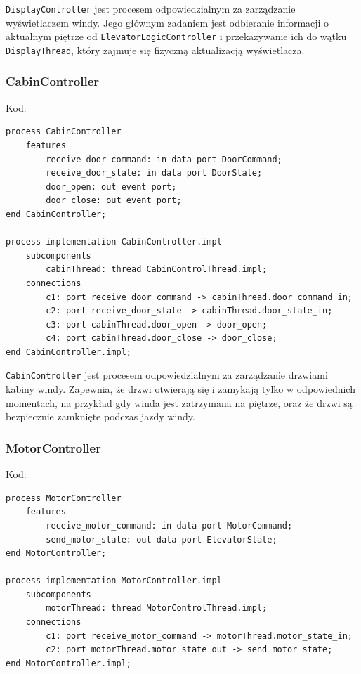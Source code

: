 \documentclass{article}
\begin{document}
    \texttt{DisplayController} jest procesem odpowiedzialnym za zarządzanie wyświetlaczem windy. Jego głównym zadaniem jest odbieranie informacji o aktualnym piętrze od \texttt{ElevatorLogicController} i przekazywanie ich do wątku \texttt{DisplayThread}, który zajmuje się fizyczną aktualizacją wyświetlacza.





    \subsubsection{CabinController}

    Kod:
    
    \begin{lstlisting}[basicstyle=\ttfamily, keywordstyle=\bfseries]
process CabinController
    features
        receive_door_command: in data port DoorCommand;
        receive_door_state: in data port DoorState;
        door_open: out event port;
        door_close: out event port;
end CabinController;

process implementation CabinController.impl
    subcomponents
        cabinThread: thread CabinControlThread.impl;
    connections
        c1: port receive_door_command -> cabinThread.door_command_in;
        c2: port receive_door_state -> cabinThread.door_state_in;
        c3: port cabinThread.door_open -> door_open;
        c4: port cabinThread.door_close -> door_close;
end CabinController.impl;
    \end{lstlisting}

    \texttt{CabinController} jest procesem odpowiedzialnym za zarządzanie drzwiami kabiny windy. Zapewnia, że drzwi otwierają się i zamykają tylko w odpowiednich momentach, na przykład gdy winda jest zatrzymana na piętrze, oraz że drzwi są bezpiecznie zamknięte podczas jazdy windy.



    \subsubsection{MotorController}

    Kod:
    
    \begin{lstlisting}[basicstyle=\ttfamily, keywordstyle=\bfseries]
process MotorController
    features
        receive_motor_command: in data port MotorCommand;
        send_motor_state: out data port ElevatorState;
end MotorController;

process implementation MotorController.impl
    subcomponents
        motorThread: thread MotorControlThread.impl; 
    connections
        c1: port receive_motor_command -> motorThread.motor_state_in;
        c2: port motorThread.motor_state_out -> send_motor_state;
end MotorController.impl;
    \end{lstlisting}
\end{document}
